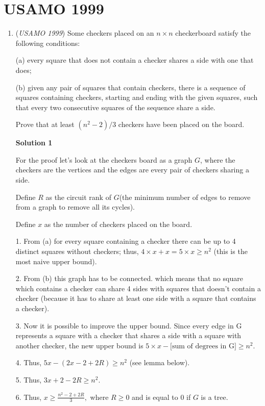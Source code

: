 \section{USAMO 1999}
        \begin{enumerate}
        	\item (\textit{USAMO 1999}) Some checkers placed on an $n\times n$ checkerboard satisfy the following conditions:


 (a) every square that does not contain a checker shares a side with one that does;


 (b) given any pair of squares that contain checkers, there is a sequence of squares containing checkers, starting and ending with the given squares, such that every two consecutive squares of the sequence share a side.


 Prove that at least $(n^{2}-2)/3$ checkers have been placed on the board.


 



\textbf{Solution 1}

For the proof let's look at the checkers board as a graph $G$, where the checkers are the vertices and the edges are every pair of checkers sharing a side.

 Define $R$ as the circuit rank of $G$(the minimum number of edges to remove from a graph to remove all its cycles).

 Define $x$ as the number of checkers placed on the board.

 1. From (a) for every square containing a checker there can be up to 4 distinct squares without checkers; thus, $4\times x + x = 5\times x \ge n^2$ (this is the most naive upper bound).

 2. From (b) this graph has to be connected. which means that no square which contains a checker can share 4 sides with squares that doesn't contain a checker (because it has to share at least one side with a square that  contains a checker).

 3. Now it is possible to improve the upper bound. Since every edge in G represents a square with a checker that shares a side with a square with another checker, the new upper bound is $5\times x - \text{[sum of degrees in G]} \ge n^2.$ 

 4. Thus, $5x - (2x - 2 + 2R) \ge n^2$ (see lemma below).

 5. Thus,  $3x + 2 - 2R \ge n^2.$

 6. Thus,  $x \ge \frac{n^2 - 2 + 2R}3,$ where $R\ge0$ and is equal to 0 if $G$ is a tree.


\end{enumerate}
